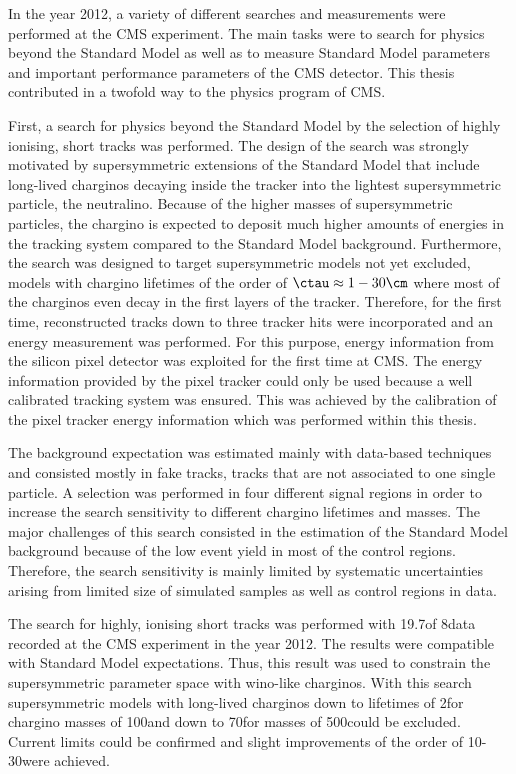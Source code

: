 In the year 2012, a variety of different searches and measurements were performed at the CMS experiment.
The main tasks were to search for physics beyond the Standard Model as well as to measure Standard Model parameters and important performance parameters of the CMS detector.
This thesis contributed in a twofold way to the physics program of CMS.

First, a search for physics beyond the Standard Model by the selection of highly ionising, short tracks was performed.
The design of the search was strongly motivated by supersymmetric extensions of the Standard Model that include long-lived charginos decaying inside the tracker into the lightest supersymmetric particle, the neutralino.
Because of the higher masses of supersymmetric particles, the chargino is expected to deposit much higher amounts of energies in the tracking system compared to the Standard Model background.
Furthermore, the search was designed to target supersymmetric models not yet excluded, \ie models with chargino lifetimes of the order of $\ctau \approx 1- 30\cm$ where most of the charginos even decay in the first layers of the tracker.
Therefore, for the first time, reconstructed tracks down to three tracker hits were incorporated and an energy measurement was performed.
For this purpose, energy information from the silicon pixel detector was exploited for the first time at CMS.
The energy information provided by the pixel tracker could only be used because a well calibrated tracking system was ensured.
This was achieved by the calibration of the pixel tracker energy information which was performed within this thesis.

The background expectation was estimated mainly with data-based techniques and consisted mostly in fake tracks, \ie tracks that are not associated to one single particle. 
A selection was performed in four different signal regions in order to increase the search sensitivity to different chargino lifetimes and masses.
The major challenges of this search consisted in the estimation of the Standard Model background because of the low event yield in most of the control regions.
Therefore, the search sensitivity is mainly limited by systematic uncertainties arising from limited size of simulated samples as well as control regions in data.

The search for highly, ionising short tracks was performed with 19.7\fbinv of 8\tev data recorded at the CMS experiment in the year 2012.
The results were compatible with Standard Model expectations.
Thus, this result was used to constrain the supersymmetric parameter space with wino-like charginos.
With this search supersymmetric models with long-lived charginos down to lifetimes of 2\cm for chargino masses of 100\gev and down to 70\cm for masses of 500\gev could be excluded.
Current limits could be confirmed and slight improvements of the order of 10-30\gev were achieved.\\


